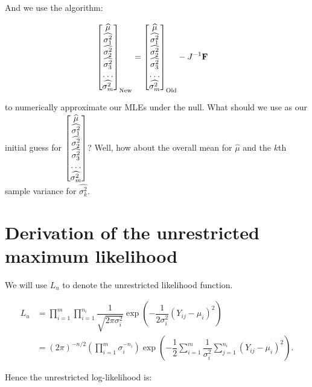 \documentclass[12pt,a4paper]{article}
\newcommand{\wmu}{\widehat{\mu}}
\newcommand{\wst}[1]{\widehat{\sigma^2_{#1}}}
\begin{document}
	And we use the algorithm:
	
	\begin{align*}
		\left[\begin{matrix}
			\wmu \\
			\wst{1} \\
			\wst{2} \\
			\wst{3} \\
			\hdotsfor{1} \\
			\wst{m}
		\end{matrix}\right]_{\mathrm{New}} &= \left[\begin{matrix}
		\wmu \\
		\wst{1} \\
		\wst{2} \\
		\wst{3} \\
		\hdotsfor{1} \\
		\wst{m}
	\end{matrix}\right]_{\mathrm{Old}} - J^{-1}\mathbf{F}
	\end{align*}

	to numerically approximate our MLEs under the null. What should we use as our initial guess for $\left[\begin{matrix}
		\wmu \\
		\wst{1} \\
		\wst{2} \\
		\wst{3} \\
		\hdotsfor{1} \\
		\wst{m}
	\end{matrix}\right]$? Well, how about the overall mean for $\wmu$ and the $k$th sample variance for $\wst{k}$. 

	\section{Derivation of the unrestricted maximum likelihood}
	We will use $L_u$ to denote the unrestricted likelihood function.
	
	\begin{align*}
		L_u &= \prod_{i=1}^m \prod_{i=1}^{n_i} \dfrac{1}{\sqrt{2\pi \sigma^2_i}} \exp{\left(-\dfrac{1}{2\sigma^2_i} (Y_{ij}-\mu_i)^2\right)} \\
		&= (2\pi)^{-n/2} \left(\prod_{i=1}^m \sigma_i^{-n_i}\right)\exp{\left(-\dfrac{1}{2}\sum_{i=1}^m \dfrac{1}{\sigma^2_i}\sum_{j=1}^{n_i} (Y_{ij}-\mu_i)^2\right)}.
	\end{align*}

	Hence the unrestricted log-likelihood is:
	
\end{document}
